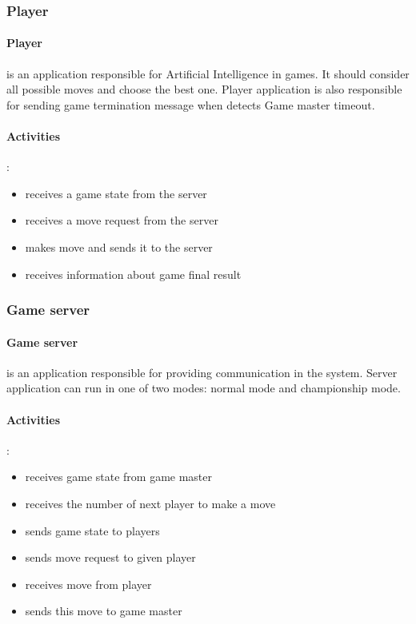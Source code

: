 \documentclass{article}
\begin{document}
\subsubsection{Player}

\paragraph{Player} is an application responsible for Artificial Intelligence in games. It should consider all possible moves and choose the best one. Player application is also responsible for sending game termination message when detects Game master timeout.

\paragraph{Activities} :
\begin{itemize}
    \item receives a game state from the server
    \item receives a move request from the server
    \item makes move and sends it to the server
    \item receives information about game final result
\end{itemize}

\subsubsection{Game server}

\paragraph{Game server} is an application responsible for providing communication in the system. Server application can run in one of two modes: normal mode and championship mode.

\paragraph{Activities} :
\begin{itemize}
  \item receives game state from game master
  \item receives the number of next player to make a move
  \item sends game state to players
  \item sends move request to given player
  \item receives move from player
  \item sends this move to game master 
\end{itemize}
\end{document}
